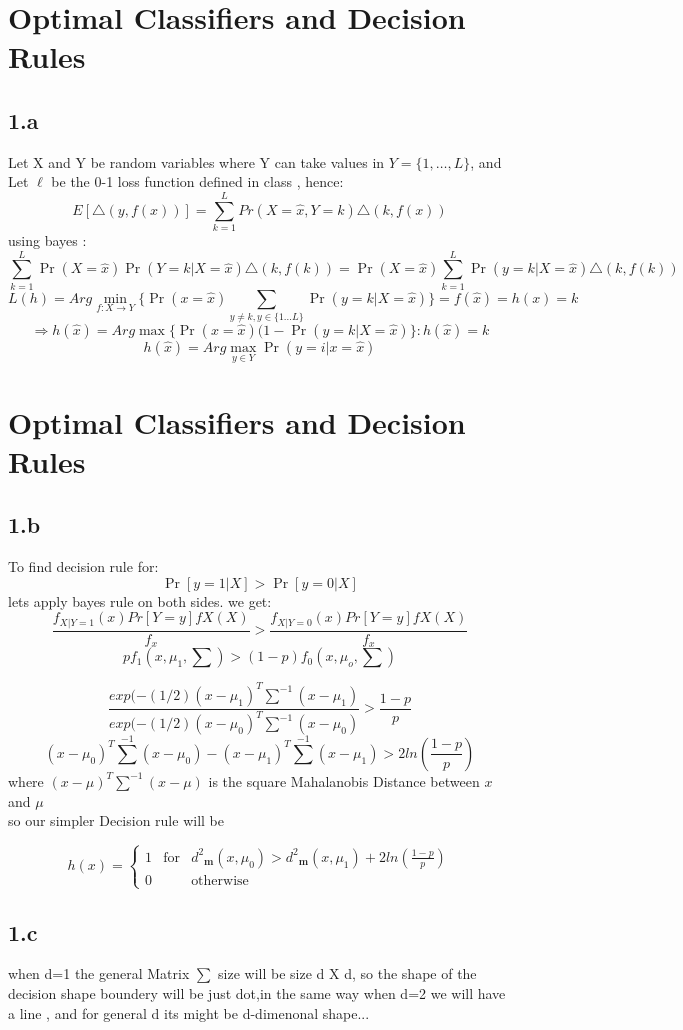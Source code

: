 \documentclass[12pt]{article}
\begin{document}
\section*{Optimal Classifiers and Decision Rules}
\subsection*{1.a}
Let X and Y be random variables where Y can take values in $Y = \lbrace1, \dots, L\rbrace$, and Let $\ell$
be the 0-1 loss function defined in class , hence:   
\[E[\triangle(y,f(x))]= \sum_{k=1}^{L}Pr(X=\hat{x},Y=k)\triangle(k,f(x))  \] 
using bayes :
\[ \sum_{k=1}^{L}\Pr(X=\hat{x})\Pr(Y=k|X=\hat{x})\triangle(k,f(k))=\Pr(X=\hat{x})\sum_{k=1}^{L}\Pr(y=k|X=\hat{x})\triangle(k,f(k))\]
\[L(h)=Arg\min_{f:X\to Y}\lbrace\Pr(x=\hat{x})\sum_{y\neq k,y\in \lbrace1\ldots L\rbrace}\Pr(y=k|X=\hat{x})\rbrace=f(\hat{x})=h(x)=k
\]
\[\Rightarrow
h(\hat{x})=Arg\max\lbrace\Pr (x=\hat{x})(1-\Pr(y=k|X=\hat{x})\rbrace : h(\hat{x})=k
\]
\[ h(\hat{x})=Arg\max_{y\in Y} \Pr(y=i|x=\hat{x})
\]
\section*{Optimal Classifiers and Decision Rules}
\subsection*{1.b}
To find decision rule for:
\[ \Pr [y = 1 | X] > \Pr [y = 0 | X]\]
lets apply bayes  rule on 
both sides.
we get:
\[ \frac{f_{X|Y =1} (x) Pr [Y = y]
fX (X)}{f_x} > \frac{f_{X|Y =0} (x) Pr [Y = y]
fX (X)}{f_x}\]
\[ p f_1 (x , \mu_1 , \sum ) >
(1-p) f_0 (x , \mu_o , \sum ) \]

\[ \frac { exp( -(1/2)(x-\mu_1)^T \sum^{-1}(x-\mu_1) }{exp( -(1/2)(x-\mu_0)^T \sum^{-1}(x-\mu_0)} > \frac{1-p}{p}
\]
\[(x-\mu_0)^T \sum^{-1}(x-\mu_0)
-(x-\mu_1)^T \sum^{-1} (x-\mu_1)>2ln(\frac{1-p}{p})
\]
where $(x-\mu)^T \sum^{-1}(x-\mu)$ is the square  Mahalanobis Distance  between $x$ and $\mu$\\
so our simpler Decision rule will be 

\[  h(x) = \left\{ \begin{array}{rcl}
{1} & \mbox{for}
& d^2\mathbf{_m}  (x,\mu_0) > d^2\mathbf{_m} (x,\mu_1)+2ln(\frac{1-p}{p}) \\ 0 & \mbox{} & \mbox{otherwise} 
\end{array}\right.
\]
\subsection*{1.c}
when d=1 the general Matrix $\sum$ size will be size d X d, so the shape of the decision shape boundery will be just dot,in the same way when d=2 we will have a line , and for general d its might be d-dimenonal shape...
\end{document}
